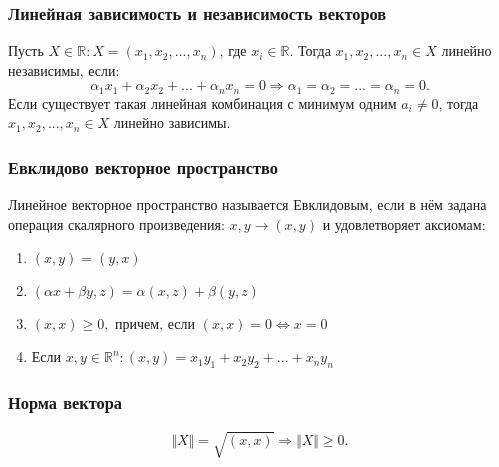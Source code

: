 \documentclass[a4paper, 12pt]{article}
\begin{document}
    \subsubsection{Линейная зависимость и независимость векторов}
    Пусть $X \in \mathbb{R} : X = (x_1, x_2, ..., x_n) \text{, где }x_i \in \mathbb{R}.$ Тогда $x_1, x_2, ... , x_n \in X$ линейно независимы, если:
    \[\alpha_1 x_1 + \alpha_2 x_2 + ...  + \alpha_n x_n = 0 \Rightarrow \alpha_1 = \alpha_2 =  ...  = \alpha_n = 0.\]
    Если существует такая линейная комбинация с минимум одним $a_i \neq 0$, тогда $x_1, x_2, ... , x_n \in X$ линейно зависимы.

    \subsubsection{Евклидово векторное пространство}
    Линейное векторное пространство называется Евклидовым, если в нём задана операция скалярного произведения: $x, y \to (x, y)$ и удовлетворяет аксиомам:
    \begin{enumerate}
        \item $(x, y) = (y, x)$
        \item $(\alpha x + \beta y, z) = \alpha(x, z) + \beta (y, z)$
        \item $(x, x) \geqslant 0, \text{ причем, если } (x, x) = 0 \Leftrightarrow x = 0$
        \item Если $x, y \in \mathbb{R}^n : (x, y) = x_1 y_1 + x_2 y_2 + ... + x_n y_n$
    \end{enumerate}

    \subsubsection{Норма вектора}
    \[\Vert X \Vert = \sqrt{(x, x)} \Rightarrow \Vert X \Vert \geqslant 0.\]
\end{document}
